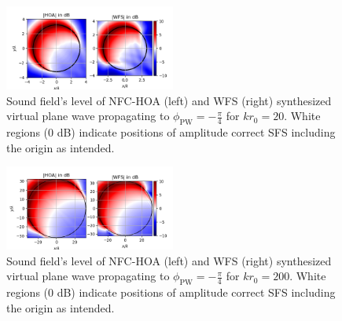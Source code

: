 \documentclass[a4paper, 10pt, twocolumn]{article}
\begin{document}
\begin{figure}[t!]
\includegraphics[width=0.5\textwidth]{HOA_WFS_RefLine_kr20.png}
\caption{Sound field's level of NFC-HOA (left) and WFS (right) synthesized virtual plane wave propagating to $\phi_\text{PW}=-\frac{\pi}{4}$ for $k r_0 = 20$.
White regions (0 dB) indicate positions of amplitude correct SFS including the origin as intended.}
\label{fig:HOA_WFS_RefLine_kr20}
\end{figure}
\begin{figure}[t!]
\includegraphics[width=0.5\textwidth]{HOA_WFS_RefLine_kr200.png}
\caption{Sound field's level of NFC-HOA (left) and WFS (right) synthesized virtual plane wave propagating to $\phi_\text{PW}=-\frac{\pi}{4}$ for $k r_0 = 200$.
White regions (0 dB) indicate positions of amplitude correct SFS including the origin as intended.}
\label{fig:HOA_WFS_RefLine_kr200}
\end{figure}
\end{document}
